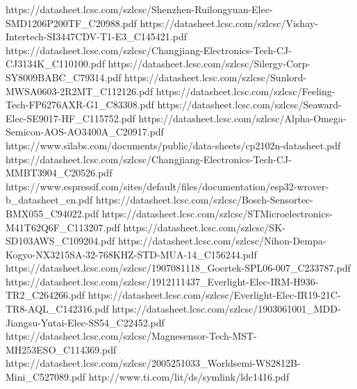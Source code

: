 https://datasheet.lcsc.com/szlcsc/Shenzhen-Ruilongyuan-Elec-SMD1206P200TF_C20988.pdf            %
https://datasheet.lcsc.com/szlcsc/Vishay-Intertech-SI3447CDV-T1-E3_C145421.pdf                  %
https://datasheet.lcsc.com/szlcsc/Changjiang-Electronics-Tech-CJ-CJ3134K_C110100.pdf            %
https://datasheet.lcsc.com/szlcsc/Silergy-Corp-SY8009BABC_C79314.pdf                            %
https://datasheet.lcsc.com/szlcsc/Sunlord-MWSA0603-2R2MT_C112126.pdf                            %
https://datasheet.lcsc.com/szlcsc/Feeling-Tech-FP6276AXR-G1_C83308.pdf                          %
https://datasheet.lcsc.com/szlcsc/Seaward-Elec-SE9017-HF_C115752.pdf                            %
https://datasheet.lcsc.com/szlcsc/Alpha-Omega-Semicon-AOS-AO3400A_C20917.pdf                    %
https://www.silabs.com/documents/public/data-sheets/cp2102n-datasheet.pdf                       %
https://datasheet.lcsc.com/szlcsc/Changjiang-Electronics-Tech-CJ-MMBT3904_C20526.pdf            %
https://www.espressif.com/sites/default/files/documentation/esp32-wrover-b_datasheet_en.pdf     %
https://datasheet.lcsc.com/szlcsc/Bosch-Sensortec-BMX055_C94022.pdf                             %
https://datasheet.lcsc.com/szlcsc/STMicroelectronics-M41T62Q6F_C113207.pdf                      %
https://datasheet.lcsc.com/szlcsc/SK-SD103AWS_C109204.pdf                                       %
https://datasheet.lcsc.com/szlcsc/Nihon-Dempa-Kogyo-NX3215SA-32-768KHZ-STD-MUA-14_C156244.pdf   %
https://datasheet.lcsc.com/szlcsc/1907081118_Goertek-SPL06-007_C233787.pdf                      %
https://datasheet.lcsc.com/szlcsc/1912111437_Everlight-Elec-IRM-H936-TR2_C264266.pdf            %
https://datasheet.lcsc.com/szlcsc/Everlight-Elec-IR19-21C-TR8-AQL_C142316.pdf                   %
https://datasheet.lcsc.com/szlcsc/1903061001_MDD-Jiangsu-Yutai-Elec-SS54_C22452.pdf             %
https://datasheet.lcsc.com/szlcsc/Magnesensor-Tech-MST-MH253ESO_C114369.pdf                     %
https://datasheet.lcsc.com/szlcsc/2005251033_Worldsemi-WS2812B-Mini_C527089.pdf                 %
http://www.ti.com/lit/ds/symlink/ldc1416.pdf                                                    %

